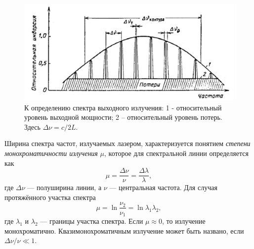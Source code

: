 \documentclass[12pt, russian, a4paper]{article}
\begin{document}
	\begin{figure}[htbp]
		\centering
		\includegraphics[scale=0.8]{freq-width.png}
		\caption{К определению спектра выходного излучения: 1 - относительный уровень выходной мощности; 2 – относительный уровень потерь. Здесь $\Delta\nu = c/2L$.}
		\label{fig:freq-width}
	\end{figure}

	Ширина спектра частот, излучаемых лазером, характеризуется понятием \emph{степени монохроматичности излучения} $\mu$, которое для спектральной линии определяется как 
	\begin{equation}
		\mu = \dfrac{\Delta\nu}{\nu} = \dfrac{\Delta\lambda}{\lambda},
	\end{equation}
	где $\Delta\nu$ --- полуширина линии, а $\nu$ --- центральная частота. Для случая протяжённого участка спектра 
	\begin{equation}
		\mu = \ln\dfrac{\nu_2}{\nu_1} = \ln{\lambda_1}{\lambda_2},
	\end{equation}
	где $\lambda_1$ и $\lambda_2$ --- границы участка спектра. Если $\mu\approx0$, то излучение монохроматично. Квазимонохроматичным излучение может быть названо, если ${\Delta\nu}/{\nu}\ll1$.


	
 
\end{document}
